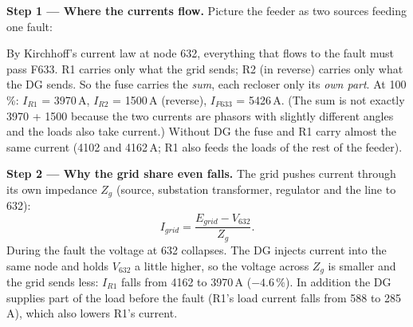 \documentclass[11pt,a4paper]{article}
\begin{document}
\textbf{Step 1 --- Where the currents flow.} Picture the feeder as two sources feeding one fault:

\begin{center}
\end{center}

By Kirchhoff's current law at node 632, everything that flows to the fault must pass F633. R1 carries only what the
grid sends; R2 (in reverse) carries only what the DG sends. So the fuse carries the \emph{sum}, each recloser only its
\emph{own part}. At 100\,\%: $I_{R1}$ = 3970\,A, $I_{R2}$ = 1500\,A (reverse), $I_{F633}$ = 5426\,A. (The sum is not
exactly 3970 + 1500 because the two currents are phasors with slightly different angles and the loads also take
current.) Without DG the fuse and R1 carry almost the same current (4102 and 4162\,A; R1 also feeds the loads of the
rest of the feeder).

\textbf{Step 2 --- Why the grid share even falls.} The grid pushes current through its own impedance $Z_g$ (source,
substation transformer, regulator and the line to 632):
\[
I_{grid} = \frac{E_{grid} - V_{632}}{Z_g}.
\]
During the fault the voltage at 632 collapses. The DG injects current into the same node and holds $V_{632}$ a little
higher, so the voltage across $Z_g$ is smaller and the grid sends less: $I_{R1}$ falls from 4162 to 3970\,A
($-4.6\,\%$). In addition the DG supplies part of the load before the fault (R1's load current falls from 588 to
285\,A), which also lowers R1's current.
\end{document}
